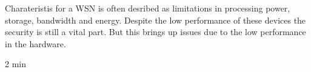 Charateristis for a WSN is often desribed as limitations in processing power, storage, bandwidth and energy. Despite the low performance of these devices the security is still a vital part. But this brings up issues due to the low performance in the hardware.

\Large{2 min}